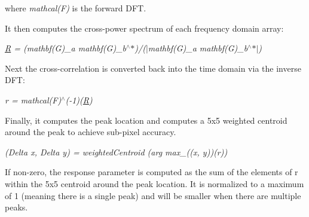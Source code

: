 where {\itshape mathcal(\+F)} is the forward D\+FT.


\begin{DoxyItemize}
\item It then computes the cross-\/power spectrum of each frequency domain array\+: 
\end{DoxyItemize}

{\itshape \mbox{\hyperlink{classorg_1_1opencv_1_1_r}{R}} = (mathbf(\+G)\+\_\+a mathbf(\+G)\+\_\+b$^\wedge$$\ast$)/($\vert$mathbf(G)\+\_\+a mathbf(\+G)\+\_\+b$^\wedge$$\ast$$\vert$)}


\begin{DoxyItemize}
\item Next the cross-\/correlation is converted back into the time domain via the inverse D\+FT\+: 
\end{DoxyItemize}

{\itshape r = mathcal(\+F)$^\wedge$(-\/1)(\mbox{\hyperlink{classorg_1_1opencv_1_1_r}{R}})}


\begin{DoxyItemize}
\item Finally, it computes the peak location and computes a 5x5 weighted centroid around the peak to achieve sub-\/pixel accuracy. 
\end{DoxyItemize}

{\itshape (Delta x, Delta y) = weighted\+Centroid (arg max\+\_\+((x, y))(r))}


\begin{DoxyItemize}
\item If non-\/zero, the response parameter is computed as the sum of the elements of r within the 5x5 centroid around the peak location. It is normalized to a maximum of 1 (meaning there is a single peak) and will be smaller when there are multiple peaks. 
\end{DoxyItemize}


